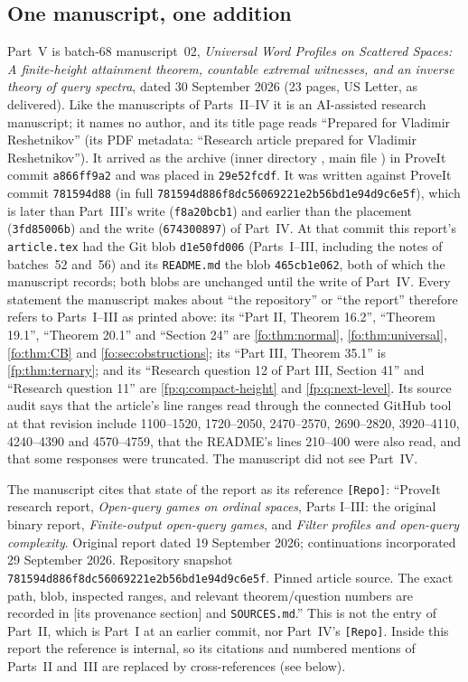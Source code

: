 \documentclass[11pt,letterpaper]{article}
\numberwithin{equation}{section}
\theoremstyle{definition}
\theoremstyle{remark}
\theoremstyle{definition}
\begin{document}
\subsection{One manuscript, one addition}
\label{uw:sec:source}
Part~V is batch-68 manuscript~02, \emph{Universal Word Profiles on Scattered
Spaces: A finite-height attainment theorem, countable extremal witnesses,
and an inverse theory of query spectra}, dated 30 September 2026 (23 pages,
US Letter, as delivered). Like the manuscripts of Parts~II--IV it is an
AI-assisted research manuscript; it names no author, and its title page
reads ``Prepared for Vladimir Reshetnikov'' (its PDF metadata: ``Research
article prepared for Vladimir Reshetnikov''). It arrived as the archive
 (inner directory
, main file ) in
ProveIt commit \texttt{a866ff9a2} and was placed in \texttt{29e52fcdf}. It
was written against ProveIt commit \texttt{781594d88} (in full
\texttt{781594d886f8dc56069221e2b56bd1e94d9c6e5f}), which is later than
Part~III's write (\texttt{f8a20bcb1}) and earlier than the placement
(\texttt{3fd85006b}) and the write (\texttt{674300897}) of Part~IV. At that
commit this report's \texttt{article.tex} had the Git blob
\texttt{d1e50fd006} (Parts~I--III, including the notes of batches~52
and~56) and its \texttt{README.md} the blob \texttt{465cb1e062}, both of
which the manuscript records; both blobs are unchanged until the write of
Part~IV. Every statement the manuscript makes about ``the repository'' or
``the report'' therefore refers to Parts~I--III as printed above: its
``Part II, Theorem 16.2'', ``Theorem 19.1'', ``Theorem 20.1'' and
``Section 24'' are \cref{fo:thm:normal}, \cref{fo:thm:universal},
\cref{fo:thm:CB} and \cref{fo:sec:obstructions}; its ``Part III, Theorem
35.1'' is \cref{fp:thm:ternary}; and its ``Research question 12 of Part
III, Section 41'' and ``Research question 11'' are \cref{fp:q:compact-height}
and \cref{fp:q:next-level}. Its source audit says that the article's line
ranges read through the connected GitHub tool at that revision include
1100--1520, 1720--2050, 2470--2570, 2690--2820, 3920--4110, 4240--4390 and
4570--4759, that the README's lines 210--400 were also read, and that some
responses were truncated. The
manuscript did not see Part~IV.

The manuscript cites that state of the report as its reference
\texttt{[Repo]}: ``ProveIt research report, \emph{Open-query games on
ordinal spaces}, Parts I--III: the original binary report,
\emph{Finite-output open-query games}, and \emph{Filter profiles and
open-query complexity}. Original report dated 19 September 2026;
continuations incorporated 29 September 2026. Repository snapshot
\texttt{781594d886f8dc56069221e2\allowbreak b56bd1e94d9c6e5f}. Pinned article source.
The exact path, blob, inspected ranges, and relevant theorem/question
numbers are recorded in [its provenance section] and \texttt{SOURCES.md}.''
This is not the entry \cite{Repo} of Part~II, which is Part~I at an earlier
commit, nor Part~IV's \texttt{[Repo]}. Inside this report the reference is
internal, so its citations and numbered mentions of Parts~II and~III are
replaced by cross-references (see below).
\end{document}
